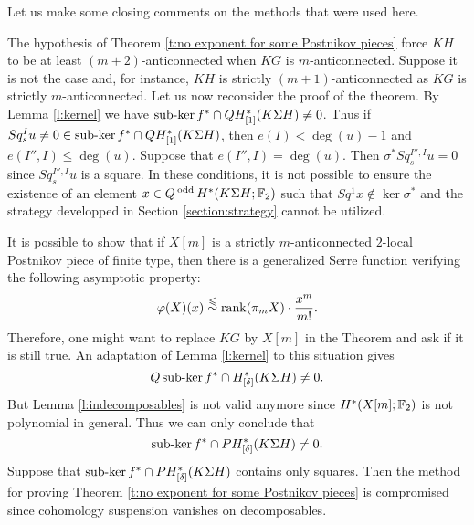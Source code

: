 \label{s:proof of thm on 2-stage Postnikov systems:discussion}
Let us make some closing comments on the methods that were used here. 

The hypothesis of Theorem \ref{t:no exponent for some Postnikov pieces} force $KH$ to be at least $(m+2)$-anticonnected when $KG$ is $m$-anticonnected. Suppose it is not the case and, for instance, $KH$ is strictly $(m+1)$-anticonnected as $KG$ is strictly $m$-anticonnected. Let us now reconsider the proof of the theorem. By Lemma \ref{l:kernel} we have $\operatorname{sub-ker} f^*\cap QH^*_{[1]}(K\Sigma H)\not=0$. Thus if $Sq^I_s u\not=0\in\operatorname{sub-ker} f^*\cap QH^*_{[1]}(K\Sigma H)$, then $e(I)<\deg(u)-1$ and $e(I'',I)\leq\deg(u)$. Suppose that $e(I'',I)=\deg(u)$. Then $\sigma^*Sq^{I'',I}_s u=0$ since $Sq^{I'',I}_s u$ is a square. In these conditions, it is not possible to ensure the existence of an element $x\in Q\operatorname{^{odd}} H^*(K\Sigma H;\mathbb{F}_2)$ such that $Sq^1x\not\in\ker\sigma^*$ and the strategy developped in Section \ref{section:strategy} cannot be utilized.

It is possible to show that if $X[m]$ is a strictly $m$-anticonnected $2$-local Postnikov piece of finite type, then there is a generalized Serre function verifying the following asymptotic property:
$$
\varphi(X)(x)\stackrel{\leqslant}{\sim}\operatorname{rank}(\pi_mX)\cdot\frac{x^m}{m!}.
$$
Therefore, one might want to replace $KG$ by $X[m]$ in the Theorem and ask if it is still true. An adaptation of Lemma \ref{l:kernel} to this situation gives
$$
Q\operatorname{sub-ker} f^*\cap H^*_{[\delta]}(K\Sigma H)\not=0.
$$ But Lemma \ref{l:indecomposables} is not valid anymore since $H^*(X[m];\mathbb{F}_2)$ is not polynomial in general. Thus we can only conclude that 
$$\operatorname{sub-ker} f^*\cap PH^*_{[\delta]}(K\Sigma H)\not=0.$$ Suppose that $\operatorname{sub-ker} f^*\cap PH^*_{[\delta]}(K\Sigma H)$ contains only squares. Then the method for proving Theorem \ref{t:no exponent for some Postnikov pieces} is compromised since cohomology suspension vanishes on decomposables.

\endinput

\begin{lem}
Let $G$ be a finitely generated $2$-torsion abelian group. For all $n>q\geq1$, we have a monomorphism 
$$\sigma^*:QH^*_{(q)}(G,n)\to QH^*_{(q)}(G,n-1).$$
\end{lem}

\begin{proof}
It is well known that $\sigma^*:QH^*(K(G,n);\F_2)\to PH^*(K(G,n);\F_2)$ is a monomorphism. Therefore the restriction to $QH^*_{(q)}(G,n)$ is also a monomorphism. Moreover, the suspension of an indecomposable in $QH^*_{(q)}(G,n)$ is not a square since its excess is lower than $n-1$ by hypothesis. Thus the Milnor-Moore theorem insures that it is an indecomposable.
\end{proof}